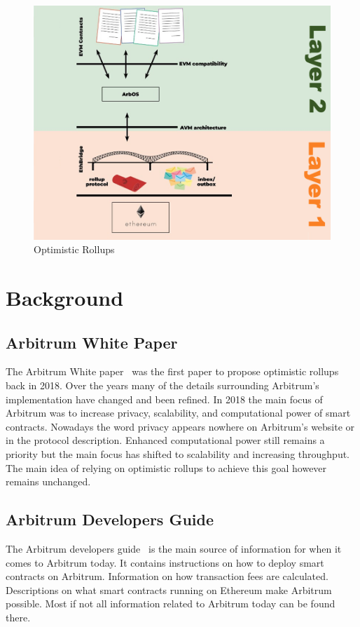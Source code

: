 \documentclass[a4paper,oneside,openright,11pt]{report}
\begin{document}
\begin{figure}[h]
	\centering
	\includegraphics[scale=0.5]{./Pictures/Optimistic-Rollup.png}
	\caption{Optimistic Rollups}
	\label{fig:Optimistic_Rollups}
\end{figure}
  
\chapter{Background}

\section{Arbitrum White Paper}
The Arbitrum White paper~\cite{ArbWP} was the first paper to propose optimistic rollups back in 2018. 
Over the years many of the details surrounding Arbitrum's implementation have changed and been refined. 
In 2018 the main focus of Arbitrum was to increase privacy, scalability, and computational power of smart
contracts. Nowadays the word privacy appears nowhere on Arbitrum's website or in the protocol description. 
Enhanced computational power still remains a priority but the main focus has shifted to scalability and 
increasing throughput. The main idea of relying on optimistic rollups to achieve this goal however
remains unchanged.

\section{Arbitrum Developers Guide}
The Arbitrum developers guide~\cite{ArbDevGuide} is the main source of information 
for when it comes to Arbitrum today. It contains instructions on how to deploy smart 
contracts on Arbitrum. Information on how transaction fees are calculated. Descriptions 
on what smart contracts running on Ethereum make Arbitrum possible. 
Most if not all information related to Arbitrum today can be found there.
\end{document}
